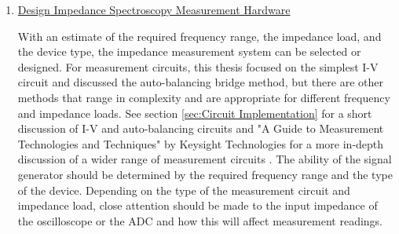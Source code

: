 \begin{enumerate}
    \item \underline{Design Impedance Spectroscopy Measurement Hardware}
    \par With an estimate of the required frequency range, the impedance load, and the device type, the impedance measurement system can be selected or designed. For measurement circuits, this thesis focused on the simplest I-V circuit and discussed the auto-balancing bridge method, but there are other methods that range in complexity and are appropriate for different frequency and impedance loads. See section \ref{sec:Circuit Implementation} for a short discussion of I-V and auto-balancing circuits and "A Guide to Measurement Technologies and Techniques" by Keysight Technologies for a more in-depth discussion of a wider range of measurement circuits \cite{keysight_technologies_impedance_2015}. The ability of the signal generator should be determined by the required frequency range and the type of the device. Depending on the type of the measurement circuit and impedance load, close attention should be made to the input impedance of the oscilloscope or the ADC and how this will affect measurement readings. 
\end{enumerate}